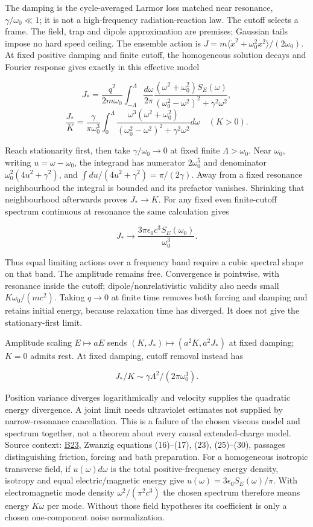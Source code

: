 \documentclass[11pt,a4paper]{article}
\begin{document}
The damping is the cycle-averaged Larmor loss matched near resonance,
\(\gamma/\omega_0\ll1\); it is not a high-frequency radiation-reaction
law. The cutoff selects a frame. The field, trap and dipole
approximation are premises; Gaussian tails impose no hard speed ceiling.
The ensemble action is
\(J=m\langle\dot x^2+\omega_0^2x^2\rangle/(2\omega_0)\). At fixed
positive damping and finite cutoff, the homogeneous solution decays and
Fourier response gives exactly in this effective model

\[J_* =\frac{q^2}{2m\omega_0}\int_{-\Lambda}^{\Lambda}\frac{d\omega}{2\pi}
 \frac{(\omega^2+\omega_0^2)S_E(\omega)}
 { (\omega_0^2-\omega^2)^2+\gamma^2\omega^2},\]
\[\frac{J_*}{K}=\frac{\gamma}{\pi\omega_0^3}\int_0^\Lambda
 \frac{\omega^3(\omega^2+\omega_0^2)}
 { (\omega_0^2-\omega^2)^2+\gamma^2\omega^2}d\omega\quad(K>0).\]

Reach stationarity first, then take \(\gamma/\omega_0\to0\) at fixed
finite \(\Lambda>\omega_0\). Near \(\omega_0\), writing
\(u=\omega-\omega_0\), the integrand has numerator \(2\omega_0^5\) and
denominator \(\omega_0^2(4u^2+\gamma^2)\), and
\(\int du/(4u^2+\gamma^2)=\pi/(2\gamma)\). Away from a fixed resonance
neighbourhood the integral is bounded and its prefactor vanishes.
Shrinking that neighbourhood afterwards proves \(J_*\to K\). For any
fixed even finite-cutoff spectrum continuous at resonance the same
calculation gives

\[J_*\longrightarrow\frac{3\pi\epsilon_0c^3S_E(\omega_0)}{\omega_0^3}.\]

Thus equal limiting actions over a frequency band require a cubic
spectral shape on that band. The amplitude remains free. Convergence is
pointwise, with resonance inside the cutoff; dipole/nonrelativistic
validity also needs small \(K\omega_0/(mc^2)\). Taking \(q\to0\) at
finite time removes both forcing and damping and retains initial energy,
because relaxation time has diverged. It does not give the
stationary-first limit.

Amplitude scaling \(E\mapsto aE\) sends \((K,J_*)\mapsto(a^2K,a^2J_*)\)
at fixed damping; \(K=0\) admits rest. At fixed damping, cutoff removal
instead has

\[J_*/K\sim\gamma\Lambda^2/(2\pi\omega_0^3).\]

Position variance diverges logarithmically and velocity supplies the
quadratic energy divergence. A joint limit needs ultraviolet estimates
not supplied by narrow-resonance cancellation. This is a failure of the
chosen viscous model and spectrum together, not a theorem about every
causal extended-charge model. Source context:
\href{../docs/batches/B23/harmonic-receiver-source-companion.md}{B23},
Zwanzig equations (16)--(17), (23), (25)--(30), passages distinguishing
friction, forcing and bath preparation. For a homogeneous isotropic
transverse field, if \(u(\omega)d\omega\) is the total
positive-frequency energy density, isotropy and equal electric/magnetic
energy give \(u(\omega)=3\epsilon_0S_E(\omega)/\pi\). With
electromagnetic mode density \(\omega^2/(\pi^2c^3)\) the chosen spectrum
therefore means energy \(K\omega\) per mode. Without those field
hypotheses its coefficient is only a chosen one-component noise
normalization.
\end{document}
